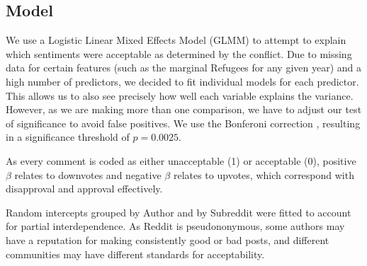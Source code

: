 \subsection{Model}
We use a Logistic Linear Mixed Effects Model (GLMM) to attempt to explain which sentiments were acceptable as determined by the conflict. Due to missing data for certain features (such as the marginal Refugees for any given year) and a high number of predictors, we decided to fit individual models for each predictor. This allows us to also see precisely how well each variable explains the variance. However, as we are making more than one comparison, we have to adjust our test of significance to avoid false positives. We use the Bonferoni correction \cite{bonferoni}, resulting in a significance threshold of $p=0.0025$.

As every comment is coded as either unacceptable (1) or acceptable (0), positive $\beta$ relates to downvotes and negative $\beta$ relates to upvotes, which correspond with disapproval and approval effectively.

Random intercepts grouped by Author and by Subreddit were fitted to account for partial interdependence. As Reddit is pseudononymous, some authors may have a reputation for making consistently good or bad posts, and different communities may have different standards for acceptability.